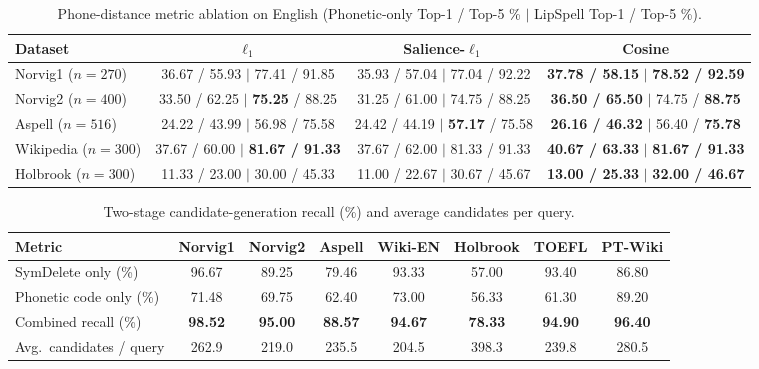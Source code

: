 \documentclass[11pt,a4paper]{article}
\begin{document}
\begin{table}[ht]
\centering
\scriptsize
\setlength{\tabcolsep}{3pt}
\caption{Phone-distance metric ablation on English (Phonetic-only Top-1 / Top-5 \% $\mid$ LipSpell Top-1 / Top-5 \%).}
\label{tab:ablation}
\begin{tabular}{lccc}
\toprule
Dataset & $\ell_1$ & Salience-$\ell_1$ & Cosine \\
\midrule
Norvig1 ($n=270$)   & 36.67 / 55.93 $\mid$ 77.41 / 91.85 & 35.93 / 57.04 $\mid$ 77.04 / 92.22 & \textbf{37.78 / 58.15} $\mid$ \textbf{78.52 / 92.59} \\
Norvig2 ($n=400$)   & 33.50 / 62.25 $\mid$ \textbf{75.25} / 88.25 & 31.25 / 61.00 $\mid$ 74.75 / 88.25 & \textbf{36.50 / 65.50} $\mid$ 74.75 / \textbf{88.75} \\
Aspell ($n=516$)    & 24.22 / 43.99 $\mid$ 56.98 / 75.58 & 24.42 / 44.19 $\mid$ \textbf{57.17} / 75.58 & \textbf{26.16 / 46.32} $\mid$ 56.40 / \textbf{75.78} \\
Wikipedia ($n=300$) & 37.67 / 60.00 $\mid$ \textbf{81.67 / 91.33} & 37.67 / 62.00 $\mid$ 81.33 / 91.33 & \textbf{40.67 / 63.33} $\mid$ \textbf{81.67 / 91.33} \\
Holbrook ($n=300$)  & 11.33 / 23.00 $\mid$ 30.00 / 45.33 & 11.00 / 22.67 $\mid$ 30.67 / 45.67 & \textbf{13.00 / 25.33} $\mid$ \textbf{32.00 / 46.67} \\
\bottomrule
\end{tabular}
\end{table}

\begin{table}[ht]
\centering
\small
\caption{Two-stage candidate-generation recall (\%) and average candidates per query.}
\label{tab:recall}
\begin{tabular}{lccccccc}
\toprule
Metric & Norvig1 & Norvig2 & Aspell & Wiki-EN & Holbrook & TOEFL & PT-Wiki \\
\midrule
SymDelete only (\%)       & 96.67 & 89.25 & 79.46 & 93.33 & 57.00 & 93.40 & 86.80 \\
Phonetic code only (\%)  & 71.48 & 69.75 & 62.40 & 73.00 & 56.33 & 61.30 & 89.20 \\
Combined recall (\%)      & \textbf{98.52} & \textbf{95.00} & \textbf{88.57} & \textbf{94.67} & \textbf{78.33} & \textbf{94.90} & \textbf{96.40} \\
Avg.\ candidates / query  & 262.9 & 219.0 & 235.5 & 204.5 & 398.3 & 239.8 & 280.5 \\
\bottomrule
\end{tabular}
\end{table}
\end{document}
